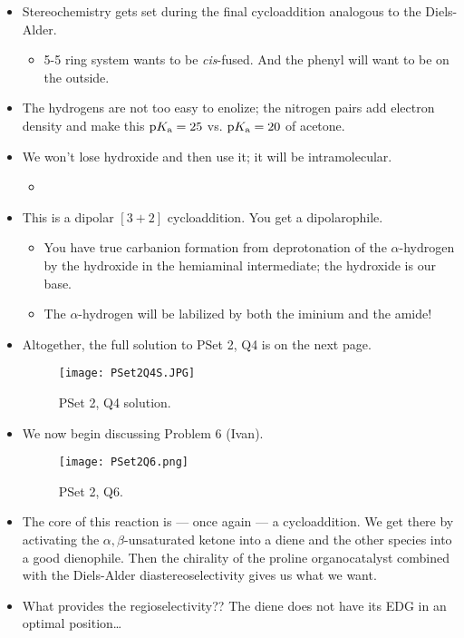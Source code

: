 \documentclass[../notes.tex]{subfiles}
\begin{document}
\begin{itemize}
    \item Stereochemistry gets set during the final cycloaddition analogous to the Diels-Alder.
    \begin{itemize}
        \item 5-5 ring system wants to be \emph{cis}-fused. And the phenyl will want to be on the outside.
    \end{itemize}
    \item The hydrogens are not too easy to enolize; the nitrogen pairs add electron density and make this $\textup{p}K_\textup{a}=25$ vs. $\textup{p}K_\textup{a}=20$ of acetone.
    \item We won't lose hydroxide and then use it; it will be intramolecular.
    \begin{itemize}
        \item 
    \end{itemize}
    \item This is a dipolar $[3+2]$ cycloaddition. You get a dipolarophile.
    \begin{itemize}
        \item You have true carbanion formation from deprotonation of the $\alpha$-hydrogen by the hydroxide in the hemiaminal intermediate; the hydroxide is our base.
        \item The $\alpha$-hydrogen will be labilized by both the iminium and the amide!
    \end{itemize}
    \item Altogether, the full solution to PSet 2, Q4 is on the next page.
    \begin{figure}[h!]
        \centering
        \texttt{[image: PSet2Q4S.JPG]}
        \caption{PSet 2, Q4 solution.}
        \label{fig:PSet2Q4S}
    \end{figure}
    \pagebreak
    \item We now begin discussing Problem 6 (Ivan).
    \begin{figure}[h!]
        \centering
        \texttt{[image: PSet2Q6.png]}
        \caption{PSet 2, Q6.}
        \label{fig:PSet2Q6}
    \end{figure}
    \item The core of this reaction is --- once again --- a cycloaddition. We get there by activating the $\alpha,\beta$-unsaturated ketone into a diene and the other species into a good dienophile. Then the chirality of the proline organocatalyst combined with the Diels-Alder diastereoselectivity gives us what we want.
    \item What provides the regioselectivity?? The diene does not have its EDG in an optimal position\dots

\end{itemize}
\end{document}

